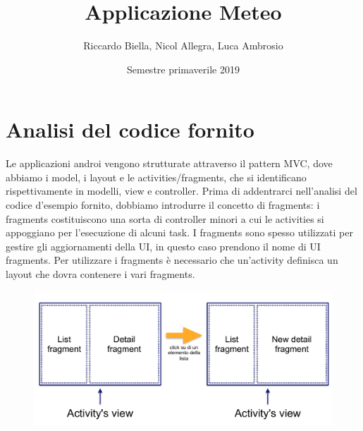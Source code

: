 \documentclass{article}
\title{\Huge Applicazione Meteo \vspace{1cm}}
\author{Riccardo Biella, Nicol Allegra, Luca Ambrosio}
\date{Semestre primaverile 2019}
\begin{document}
\maketitle
\thispagestyle{empty}
\pagebreak


\tableofcontents
\lstset{language=C++}
\pagebreak

\section{Analisi del codice fornito}
Le applicazioni androi vengono strutturate attraverso il pattern MVC, dove abbiamo i model, i layout e le activities/fragments, che si identificano rispettivamente in modelli, view e controller.
Prima di addentrarci nell'analisi del codice d'esempio fornito, dobbiamo introdurre il concetto di fragments: i fragments costituiscono una sorta di controller minori a cui le activities si appoggiano per l'esecuzione di alcuni task.
I fragments sono spesso utilizzati per gestire gli aggiornamenti della UI, in questo caso prendono il nome di UI fragments.
Per utilizzare i fragments è necessario che un'activity definisca un layout che dovra contenere i vari fragments.

\begin{figure}[H]
    \center
    \includegraphics[scale=0.25]{images/fig1.png}
\end{figure}
\end{document}
